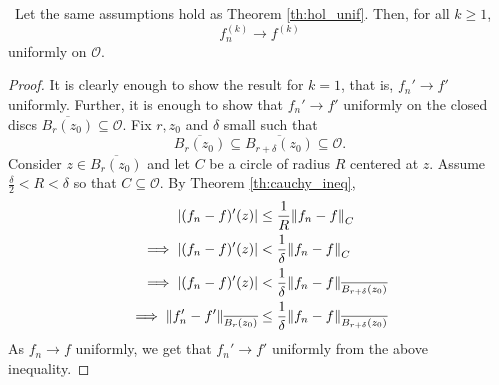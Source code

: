 \documentclass[../ComplexAnalysis_Notes.tex]{subfiles}
\begin{document}
\begin{Thm}{}{}
 \, Let the same assumptions hold as Theorem \ref{th:hol_unif}. Then, for all \( k \geq 1 \),
 \[ 
  f_n^{(k)} \to f^{(k)} 
  \]
  uniformly on \( \mathcal{O} \).
 \end{Thm}

\begin{proof} 
 It is clearly enough to show the result for \( k=1 \), that is, \( f_n' \to f' \) uniformly. Further, it is enough to show that \( f_n' \to f' \) uniformly on the closed discs \( \overline{B_r(z_0)} \subseteq \mathcal{O} \). Fix \( r, z_0 \) and \( \delta \) small such that
 \[ 
  \overline{B_r(z_0)} \subseteq \overline{B_{r+\delta}(z_0)} \subseteq \mathcal{O}.
  \]
  Consider \( z \in \overline{B_r(z_0)} \) and let \( C \) be a circle of radius \( R \) centered at \( z \). Assume \( \frac{\delta}{2} < R < \delta \) so that \( C \subseteq \mathcal{O} \). By Theorem \ref{th:cauchy_ineq},
  \begin{align*}
     \abs{(f_n - f)'(z)} 
     &\leq \frac{1}{R}\norm{f_n-f}_C \\
     \implies \abs{(f_n - f)'(z)} 
     &< \frac{1}{\delta} \norm{f_n-f}_C \\
     \implies \abs{(f_n - f)'(z)} 
     &< \frac{1}{\delta} \norm{f_n-f}_{\overline{B_{r+\delta}(z_0)}} \\
     \implies \norm{f_n'-f'}_{\overline{B_r(z_0)}}
     &\leq \frac{1}{\delta} \norm{f_n-f}_{\overline{B_{r+\delta}(z_0)}}
  \end{align*}
  As \( f_n \to f \) uniformly, we get that \( f_n' \to f' \) uniformly from the above inequality.
 \end{proof}
\end{document}
